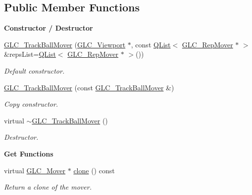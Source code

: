 \subsection*{Public Member Functions}
\begin{Indent}{\bf Constructor / Destructor}\par
\begin{DoxyCompactItemize}
\item 
\hyperlink{class_g_l_c___track_ball_mover_ab91b501d9209f2377cacc10f219ef789}{G\-L\-C\-\_\-\-Track\-Ball\-Mover} (\hyperlink{class_g_l_c___viewport}{G\-L\-C\-\_\-\-Viewport} $\ast$, const \hyperlink{class_q_list}{Q\-List}$<$ \hyperlink{class_g_l_c___rep_mover}{G\-L\-C\-\_\-\-Rep\-Mover} $\ast$ $>$ \&reps\-List=\hyperlink{class_q_list}{Q\-List}$<$ \hyperlink{class_g_l_c___rep_mover}{G\-L\-C\-\_\-\-Rep\-Mover} $\ast$ $>$())
\begin{DoxyCompactList}\small\item\em Default constructor. \end{DoxyCompactList}\item 
\hyperlink{class_g_l_c___track_ball_mover_a6319b9cb3c954f7e4da2af097a0870cb}{G\-L\-C\-\_\-\-Track\-Ball\-Mover} (const \hyperlink{class_g_l_c___track_ball_mover}{G\-L\-C\-\_\-\-Track\-Ball\-Mover} \&)
\begin{DoxyCompactList}\small\item\em Copy constructor. \end{DoxyCompactList}\item 
virtual \hyperlink{class_g_l_c___track_ball_mover_abe60a25ca44178bdb4136f116f617cdd}{$\sim$\-G\-L\-C\-\_\-\-Track\-Ball\-Mover} ()
\begin{DoxyCompactList}\small\item\em Destructor. \end{DoxyCompactList}\end{DoxyCompactItemize}
\end{Indent}
\begin{Indent}{\bf Get Functions}\par
\begin{DoxyCompactItemize}
\item 
virtual \hyperlink{class_g_l_c___mover}{G\-L\-C\-\_\-\-Mover} $\ast$ \hyperlink{class_g_l_c___track_ball_mover_ae4d9805062308f16c153608c92387135}{clone} () const 
\begin{DoxyCompactList}\small\item\em Return a clone of the mover. \end{DoxyCompactList}\end{DoxyCompactItemize}
\end{Indent}
